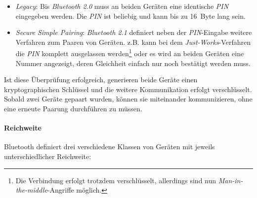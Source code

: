                 \begin{itemize}
                    \item{\emph{Legacy}:} Bis \emph{Bluetooth 2.0} muss an beiden Geräten eine identische \emph{PIN}
                                   eingegeben werden. Die \emph{PIN} ist beliebig und kann bis zu
                                   16~Byte lang sein.
                    \item{\emph{Secure Simple Pairing}:} \emph{Bluetooth 2.1} definiert neben der \emph{PIN}-Eingabe
                                                  weitere Verfahren zum Paaren von Geräten.
                                                  z.B. kann bei dem \emph{Just-Works}-Verfahren
                                                  die \emph{PIN} komplett ausgelassen werden\footnote{Die
                                                  Verbindung erfolgt trotzdem verschlüsselt,
                                                  allerdings sind nun \emph{Man-in-the-middle}-Angriffe 
                                                  möglich.} oder es wird an beiden Geräten eine
                                                  Nummer angezeigt, deren Gleichheit einfach
                                                  nur noch bestätigt werden muss.
                \end{itemize}

                Ist diese Überprüfung erfolgreich, generieren beide Geräte einen kryptographischen
                Schlüssel und die weitere Kommunikation erfolgt verschlüsselt. Sobald zwei
                Geräte gepaart wurden, können sie miteinander kommunizieren, ohne eine erneute
                Paarung durchführen zu müssen.

            \paragraph{Reichweite}
                Bluetooth definiert drei verschiedene Klassen von Geräten mit jeweils
                unterschiedlicher Reichweite:

